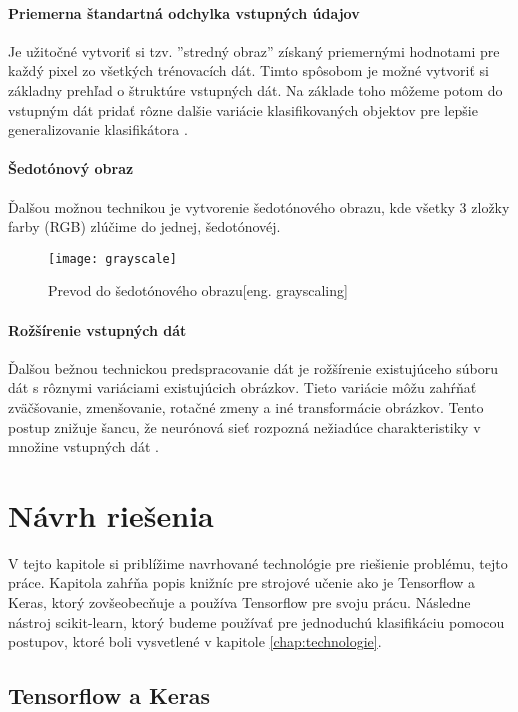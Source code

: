 \subsubsection{Priemerna štandartná odchylka vstupných údajov}
Je užitočné vytvoriť si tzv. ''stredný obraz'' získaný priemernými hodnotami pre každý pixel zo všetkých trénovacích dát.
Timto spôsobom je možné vytvoriť si základny prehľad o štruktúre vstupných dát.
Na základe toho môžeme potom do vstupným dát pridať rôzne dalšie variácie klasifikovaných objektov pre lepšie generalizovanie klasifikátora \cite{odkaz:NNPreprocessing}.

\subsubsection{Šedotónový obraz}
Ďalšou možnou technikou je vytvorenie šedotónového obrazu, kde všetky 3 zložky farby (RGB) zlúčime do jednej, šedotónovéj.
\begin{figure}[H]
	\centering
	\texttt{[image: grayscale]}
	\caption{Prevod do šedotónového obrazu[eng. grayscaling]\cite{odkaz:NNPreprocessing}}
	\label{pic:GrayScaling}
\end{figure}

\subsubsection{Rožšírenie vstupných dát}
Ďalšou bežnou technickou predspracovanie dát je rožšírenie existujúceho súboru dát s rôznymi variáciami existujúcich obrázkov.
Tieto variácie môžu zahŕňať zväčšovanie, zmenšovanie, rotačné zmeny a iné transformácie obrázkov.
Tento postup znižuje šancu, že neurónová sieť rozpozná nežiadúce charakteristiky v množine vstupných dát \cite{odkaz:NNPreprocessing}.


\chapter{Návrh riešenia}

V tejto kapitole si priblížime navrhované technológie pre riešienie problému, tejto práce.
Kapitola zahŕňa popis knižníc pre strojové učenie ako je Tensorflow a Keras, ktorý zovšeobecňuje a používa Tensorflow pre svoju prácu.
Následne nástroj scikit-learn, ktorý budeme používať pre jednoduchú klasifikáciu pomocou postupov, ktoré boli vysvetlené v kapitole \ref{chap:technologie}.

\section{Tensorflow a Keras}
\label{sec:TensorflowKeras}

